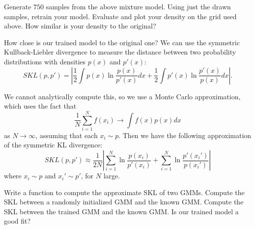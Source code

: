 \begin{problem}
Generate $750$ samples from the above mixture model. Using just the drawn samples, retrain your model. Evaluate and plot your density on the grid used above. How similar is your density to the original?
\end{problem}

How close is our trained model to the original one? We can use the symmetric Kullback-Liebler divergence to measure the distance between two probability distributions with densities $p(x)$ and $p'(x)$:
$$SKL(p,p') = |\frac{1}{2} \int p(x) \ln \frac{p(x)}{p'(x)} dx + \frac{1}{2} \int p'(x) \ln \frac{p'(x)}{p(x)} dx |.$$

We cannot analytically compute this, so we use a Monte Carlo approximation, which uses the fact that $$\frac{1}{N} \sum_{i=1}^{N} f(x_{i}) \rightarrow \int f(x) p(x) dx$$ as $N \rightarrow \infty$, assuming that each $x_{i} \sim p$. Then we have the following approximation of the symmetric KL divergence:
$$SKL(p,p') \approx \frac{1}{2N} \left\vert \sum_{i=1}^{N} \ln \frac{p(x_{i})}{p'(x_{i})} + \sum_{i=1}^{N} \ln \frac{p'(x_{i}')}{p(x_{i}')} \right\vert$$ where $x_{i} \sim p$ and $x_{i}' \sim p'$, for $N$ large.

\begin{problem}
Write a function to compute the approximate SKL of two GMMs. Compute the SKL between a randomly initialized GMM and the known GMM. Compute the SKL between the trained GMM and the known GMM. Is our trained model a good fit?
\end{problem}